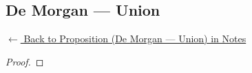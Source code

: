 
\subsection*{De Morgan --- Union}
\label{prf:demorgan-cup}

\begin{remark*}[Return]
\hyperref[prop:demorgan-cup]{$\leftarrow$ Back to Proposition (De Morgan --- Union) in Notes}
\end{remark*}

\begin{proof}
\end{proof}

\begin{remark*}

\end{remark*}

\begin{remark*}[Dependencies]

\FlashUses{}
\end{remark*}
